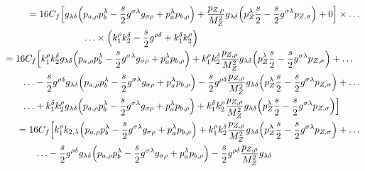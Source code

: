 \documentclass[12 pt,draft]{article}
\renewcommand{\b}[1]{\overline{#1}}
\begin{document}
\begin{problem}[ $\mu\b{\mu}\rightarrow f\b{f}$]
\begin{align}
			\begin{split}
				&=16C_f
				\Big[
				g_{\lambda\delta}
				\qty(
					p_{a,\rho}p_{b}^{\lambda}
					-\oo[s]{2}g^{\sigma\lambda}g_{\sigma\rho}
					+p_{a}^{\lambda}p_{b,\rho}
				)
				+\frac{p_{Z,\rho} }{M_Z^2}g_{\lambda\delta}
				\qty(
					p_{Z}^{\lambda}\oo[s]{2}
					-\oo[s]{2}g^{\sigma\lambda}p_{Z,\sigma}
				)
				+0
				\Big]
				\times\ldots\\&\qquad\qquad\qquad\ldots\times
				\qty(
					k_{1}^{\rho}k_{2}^{\delta}
					-\oo[s]{2}g^{\rho\delta}
					+k_{1}^{\delta}k_{2}^{\rho}
					)
			\end{split}
			\\
			\begin{split}
				&=16C_f
				\Big[
					k_{1}^{\rho}k_{2}^{\delta}g_{\lambda\delta}
					\qty(p_{a,\rho}p_{b}^{\lambda}
						-\oo[s]{2}g^{\sigma\lambda}g_{\sigma\rho}
						+p_{a}^{\lambda}p_{b,\rho})
					+k_{1}^{\rho}k_{2}^{\delta}\frac{p_{Z,\rho} }{M_Z^2}g_{\lambda\delta}
					\qty(p_{Z}^{\lambda}\oo[s]{2}
						-\oo[s]{2}g^{\sigma\lambda}p_{Z,\sigma})
					+\ldots\\&\qquad\ldots
					-\oo[s]{2}g^{\rho\delta}g_{\lambda\delta}
					\qty(p_{a,\rho}p_{b}^{\lambda}
						-\oo[s]{2}g^{\sigma\lambda}g_{\sigma\rho}
						+p_{a}^{\lambda}p_{b,\rho})
					-\oo[s]{2}g^{\rho\delta}\frac{p_{Z,\rho} }{M_Z^2}g_{\lambda\delta}
					\qty(p_{Z}^{\lambda}\oo[s]{2}
						-\oo[s]{2}g^{\sigma\lambda}p_{Z,\sigma})
					+\ldots\\&\qquad\ldots+
					k_{1}^{\delta}k_{2}^{\rho}g_{\lambda\delta}
					\qty(p_{a,\rho}p_{b}^{\lambda}
						-\oo[s]{2}g^{\sigma\lambda}g_{\sigma\rho}
						+p_{a}^{\lambda}p_{b,\rho})
					+k_{1}^{\delta}k_{2}^{\rho}\frac{p_{Z,\rho} }{M_Z^2}g_{\lambda\delta}
					\qty(p_{Z}^{\lambda}\oo[s]{2}
						-\oo[s]{2}g^{\sigma\lambda}p_{Z,\sigma})
				\Big]
			\end{split}
			\\
			\begin{split}
				&=16C_f
				\Big[
					k_{1}^{\rho}k_{2,\lambda}
					\qty(p_{a,\rho}p_{b}^{\lambda}
						-\oo[s]{2}g^{\sigma\lambda}g_{\sigma\rho}
						+p_{a}^{\lambda}p_{b,\rho})
					+k_{1}^{\rho}k_{2}^{\delta}\frac{p_{Z,\rho} }{M_Z^2}g_{\lambda\delta}
					\qty(p_{Z}^{\lambda}\oo[s]{2}
						-\oo[s]{2}g^{\sigma\lambda}p_{Z,\sigma})
					+\ldots\\&\qquad\ldots
					-\oo[s]{2}g^{\rho\delta}g_{\lambda\delta}
					\qty(p_{a,\rho}p_{b}^{\lambda}
						-\oo[s]{2}g^{\sigma\lambda}g_{\sigma\rho}
						+p_{a}^{\lambda}p_{b,\rho})
					-\oo[s]{2}g^{\rho\delta}\frac{p_{Z,\rho} }{M_Z^2}g_{\lambda\delta}

\end{split}
\end{align}
\end{problem}
\end{document}
